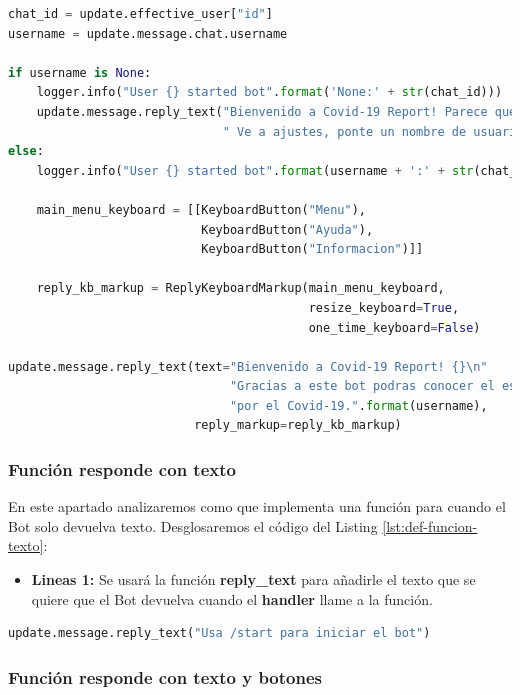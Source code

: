 \begin{lstlisting}[language=Python, caption={Función de inicio del Bot.}, label={lst:def-funcion-inicio}]
chat_id = update.effective_user["id"]
username = update.message.chat.username

if username is None:
	logger.info("User {} started bot".format('None:' + str(chat_id)))
	update.message.reply_text("Bienvenido a Covid-19 Report! Parece que no tienes usuario de Telegram."
							  " Ve a ajustes, ponte un nombre de usuario y podremos empezar.")
else:
	logger.info("User {} started bot".format(username + ':' + str(chat_id)))

	main_menu_keyboard = [[KeyboardButton("Menu"),
						   KeyboardButton("Ayuda"),
						   KeyboardButton("Informacion")]]

	reply_kb_markup = ReplyKeyboardMarkup(main_menu_keyboard,
										  resize_keyboard=True,
										  one_time_keyboard=False)

update.message.reply_text(text="Bienvenido a Covid-19 Report! {}\n"
							   "Gracias a este bot podras conocer el estado de la situacion actual provocada "
							   "por el Covid-19.".format(username),
						  reply_markup=reply_kb_markup)
\end{lstlisting}

\subsubsection{Función responde con texto}

En este apartado analizaremos como que implementa una función para cuando el Bot solo devuelva texto. Desglosaremos el código del Listing \ref{lst:def-funcion-texto}:

\begin{itemize}
	\item \textbf{Lineas 1:} Se usará la función \textbf{reply\_text} para añadirle el texto que se quiere que el Bot devuelva cuando el \textbf{handler} llame a la función.
\end{itemize}

\begin{lstlisting}[language=Python, caption={Función que devuelve texto en el chat.}, label={lst:def-funcion-texto}]
update.message.reply_text("Usa /start para iniciar el bot")
\end{lstlisting}

\subsubsection{Función responde con texto y botones}


